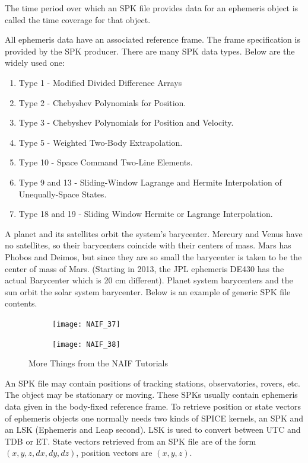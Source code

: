 \documentclass[crop=false,class=book]{standalone}
\begin{document}
\begin{definition}
The time period over which an SPK file provides data for an ephemeris object is called the time coverage for that object.
\end{definition}
All ephemeris data have an associated reference frame. The frame specification is provided by the SPK producer. There are many SPK data types. Below are the widely used one:
\begin{enumerate}
    \item Type 1 - Modified Divided Difference Arrays
    \item Type 2 - Chebyshev Polynomials for Position.
    \item Type 3 - Chebyshev Polynomials for Position and Velocity.
    \item Type 5 - Weighted Two-Body Extrapolation.
    \item Type 10 - Space Command Two-Line Elements.
    \item Type 9 and 13 - Sliding-Window Lagrange and Hermite Interpolation of Unequally-Space States.
    \item Type 18 and 19 - Sliding Window Hermite or Lagrange Interpolation.
\end{enumerate}
A planet and its satellites orbit the system's barycenter. Mercury and Venus have no satellites, so their barycenters coincide with their centers of mass. Mars has Phobos and Deimos, but since they are so small the barycenter is taken to be the center of mass of Mars. (Starting in 2013, the JPL ephemeris DE430 has the actual Barycenter which is 20 cm different). Planet system barycenters and the sun orbit the solar system barycenter. Below is an example of generic SPK file contents.
\begin{figure}[H]
    \centering
    \begin{subfigure}[b]{0.49\textwidth}
        \texttt{[image: NAIF\_37]}
    \end{subfigure}
    \begin{subfigure}[b]{0.49\textwidth}
        \texttt{[image: NAIF\_38]}
    \end{subfigure}
    \caption{More Things from the NAIF Tutorials}
    \label{fig:naif_more_things}
\end{figure}
An SPK file may contain positions of tracking stations, observatories, rovers, etc. The object may be stationary or moving. These SPKs usually contain ephemeris data given in the body-fixed reference frame. To retrieve position or state vectors of ephemeris objects one normally needs two kinds of SPICE kernels, an SPK and an LSK (Ephemeris and Leap second). LSK is used to convert between UTC and TDB or ET. State vectors retrieved from an SPK file are of the form $(x,y,z,dx,dy,dz)$, position vectors are $(x,y,z)$.
\end{document}
